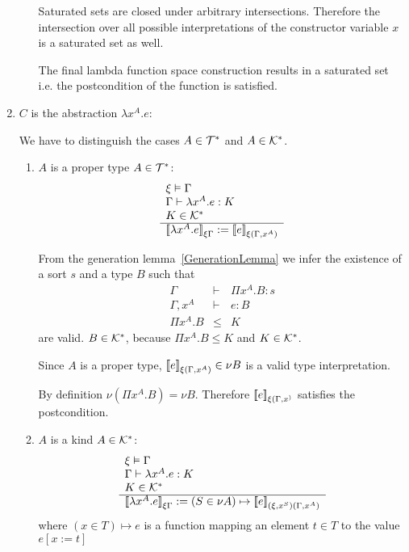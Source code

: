 \begin{definition}
\begin{enumerate}
\begin{enumerate}
            Saturated sets are closed under arbitrary intersections. Therefore the
            intersection over all possible interpretations of the constructor
            variable $x$ is a saturated set as well.

            The final lambda function space construction results in a saturated set
            i.e. the postcondition of the function is satisfied.
        \end{enumerate}

    \item $C$ is the abstraction $\lambda x^A. e$:

        We have to distinguish the cases $A \in {\cal T}^*$ and $A \in {\cal K}^*$.

        \begin{enumerate}
        \item $A$ is a proper type $A \in {\cal T}^*$:
            $$
            \begin{array}{l} 
                \xi \vDash \Gamma
                \\
                \Gamma \vdash \lambda x^A.e : K
                \\
                K \in {\cal K}^*
             \\ \hline 
                {{[\![}\lambda x^A. e{]\!]}}_{\xi\Gamma}
                :=
                {{[\![} e{]\!]}}_{\xi (\Gamma,x^A)}
            \end{array}
            $$

            From the generation lemma~\ref{GenerationLemma} we infer the
            existence of a sort $s$ and a type $B$ such that
            $$
            \begin{array}{lll}
                \Gamma &\vdash& \Pi x^A. B: s
                \\
                \Gamma,x^A &\vdash& e : B
                \\
                \Pi x^A. B &\le& K
            \end{array}
            $$
            are valid. $B \in {\cal K}^*$, because $\Pi x^A.B \le K$ and $K \in
            {\cal K}^*$.

            Since $A$ is a proper type,
            ${{[\![} e{]\!]}}_{\xi (\Gamma,x^A)} \in \nu B$
            is a valid type interpretation.

            By definition $\nu (\Pi x^A. B) = \nu B$. Therefore
            ${{[\![} e{]\!]}}_{\xi (\Gamma,x^)}$ satisfies the postcondition.

        \item $A$ is a kind $A \in {\cal K}^*$:
            $$
            \begin{array}{l} 
                \xi \vDash \Gamma
                \\
                \Gamma \vdash \lambda x^A.e : K
                \\
                K \in {\cal K}^*
             \\ \hline 
                {{[\![}\lambda x^A. e{]\!]}}_{\xi\Gamma}
                :=
                (S \in \nu A) \mapsto
                {{[\![}e{]\!]}}_{(\xi,x^S) (\Gamma,x^A)}
            \end{array}
            $$
            where $(x \in T) \mapsto e$ is a function mapping an element $t \in
            T$ to the value $e[x:=t]$


\end{enumerate}
\end{enumerate}
\end{definition}

